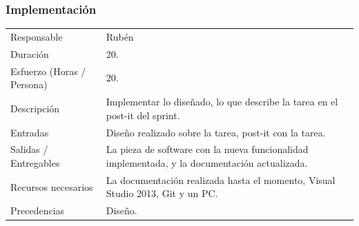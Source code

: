 \subsubsection{Implementaci\'{o}n}
\begin{table}[H]
    \begin{center}
        \begin{tabular}{l p{8cm}}
            Responsable                           & Rub\'{e}n \\
            Duraci\'{o}n                          & 20. \\ 
            Esfuerzo (Horas / Persona)            & 20. \\
            Descripci\'{o}n                       & Implementar lo dise\~{n}ado, lo que describe la tarea en el post-it del sprint. \\
            Entradas                              & Dise\~{n}o realizado sobre la tarea, post-it con la tarea.\\
            Salidas / Entregables                 & La pieza de software con la nueva funcionalidad implementada, y la documentaci\'{o}n
                                                    actualizada. \\
            Recursos necesarios                   & La documentaci\'{o}n realizada hasta el momento, Visual Studio 2013, Git y un PC. \\
            Precedencias                          & Dise\~{n}o. \\
        \end{tabular}
    \end{center}
    
\end{table}

